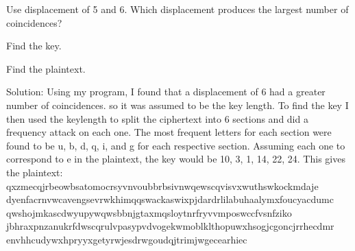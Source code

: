 \documentclass[12pt,letterpaper,final]{report}
\begin{document}
\bigskip
{}
\begin{alphalist}
	\item Use displacement of 5 and 6. Which displacement produces the largest number of coincidences?
	\item Find the key.
	\item Find the plaintext.
\end{alphalist}

\bigskip
\indent Solution: 
\bigskip
Using  my program, I found that a displacement of 6 had a greater number of coincidences. so it was assumed to be the key length. To find the key I then used the keylength to split the ciphertext into 6 sections and did a frequency attack on each one.
 The most frequent letters for each section were found to be u, b, d, q, i, and g for each respective section. Assuming each one to correspond to e in the plaintext, the key would be 10, 3, 1, 14, 22, 24. This gives the plaintext:
\bigskip
\newline qxzmecqjrbeowbsatomocrsyvnvoubbrbsivnwqewscqvisvxwuthswkockmdaje 
\newline dyenfacrnvwcavengsevrwkhimqqswackaswixpjdardrlilabuhaalymxfoucyacdumc
\newline qwshojmkascdwyupywqwsbbnjgtaxmqsloytnrfryvvmposwccfvsnfziko
\newline jbhraxpnzanukrfdwscqrulvpasypvdvogekwmoblklthopuwxhsogjcgoncjrrhecdmr
\newline envhhcudywxhpryyxgetyrwjesdrwgoudqjtrimjwgecearhiec
\end{document}
